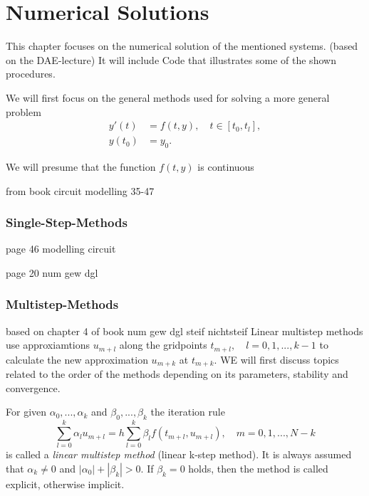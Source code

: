 \chapter{Numerical Solutions}
This chapter focuses on the numerical solution of the mentioned systems. (based on the DAE-lecture)
It will include Code that illustrates some of the shown procedures.

We will first focus on the general methods used for solving a more general problem
\begin{align}
	\label{general numerical problem}
	y'(t) &= f(t,y), \quad t \in [t_0, t_l], \\
	y(t_0) &= y_0.
\end{align}


We will presume that the function $f(t,y)$ is continuous 


from book circuit modelling 35-47

\subsection{Single-Step-Methods}
page 46 modelling circuit

page 20 num gew dgl
\subsection{Multistep-Methods}
based on chapter 4 of book num gew dgl steif nichtsteif \newline
Linear multistep methods use approxiamtions $u_{m+l}$ along the gridpoints $t_{m+l}, \quad l=0,1,...,k-1$ to calculate the new approximation $u_{m+k}$ at $t_{m+k}$. WE will first discuss topics related to the order of the methods depending on its parameters, stability and convergence.

\begin{definition}
	For given $\alpha_0, ..., \alpha_k$ and $\beta_0, ..., \beta_k$ the iteration rule
	\begin{equation}
		\label{linear-multistep-method}
		\sum_{l=0}^{k} \alpha_l u_{m+l} = h \sum_{l=0}^{k} \beta_l f(t_{m+l}, u_{m+l}), \quad m=0,1,...,N-k
	\end{equation}
	is called a \emph{linear multistep method} (linear k-step method). It is always assumed that $\alpha_k \neq 0$ and $|\alpha_0| + |\beta_k| > 0$. If $\beta_k=0$ holds, then the method is called explicit, otherwise implicit.
\end{definition}


